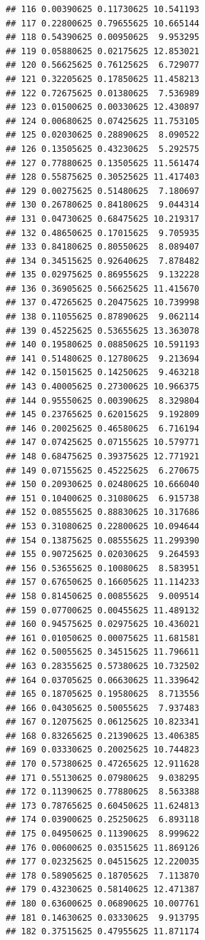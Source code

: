 \documentclass[
  12pt,
  a4paper,
  oneside]{book}
\theoremstyle{definition}
\theoremstyle{definition}
\theoremstyle{definition}
\theoremstyle{remark}
\begin{document}
\begin{lstlisting}
## 116 0.00390625 0.11730625 10.541193
## 117 0.22800625 0.79655625 10.665144
## 118 0.54390625 0.00950625  9.953295
## 119 0.05880625 0.02175625 12.853021
## 120 0.56625625 0.76125625  6.729077
## 121 0.32205625 0.17850625 11.458213
## 122 0.72675625 0.01380625  7.536989
## 123 0.01500625 0.00330625 12.430897
## 124 0.00680625 0.07425625 11.753105
## 125 0.02030625 0.28890625  8.090522
## 126 0.13505625 0.43230625  5.292575
## 127 0.77880625 0.13505625 11.561474
## 128 0.55875625 0.30525625 11.417403
## 129 0.00275625 0.51480625  7.180697
## 130 0.26780625 0.84180625  9.044314
## 131 0.04730625 0.68475625 10.219317
## 132 0.48650625 0.17015625  9.705935
## 133 0.84180625 0.80550625  8.089407
## 134 0.34515625 0.92640625  7.878482
## 135 0.02975625 0.86955625  9.132228
## 136 0.36905625 0.56625625 11.415670
## 137 0.47265625 0.20475625 10.739998
## 138 0.11055625 0.87890625  9.062114
## 139 0.45225625 0.53655625 13.363078
## 140 0.19580625 0.08850625 10.591193
## 141 0.51480625 0.12780625  9.213694
## 142 0.15015625 0.14250625  9.463218
## 143 0.40005625 0.27300625 10.966375
## 144 0.95550625 0.00390625  8.329804
## 145 0.23765625 0.62015625  9.192809
## 146 0.20025625 0.46580625  6.716194
## 147 0.07425625 0.07155625 10.579771
## 148 0.68475625 0.39375625 12.771921
## 149 0.07155625 0.45225625  6.270675
## 150 0.20930625 0.02480625 10.666040
## 151 0.10400625 0.31080625  6.915738
## 152 0.08555625 0.88830625 10.317686
## 153 0.31080625 0.22800625 10.094644
## 154 0.13875625 0.08555625 11.299390
## 155 0.90725625 0.02030625  9.264593
## 156 0.53655625 0.10080625  8.583951
## 157 0.67650625 0.16605625 11.114233
## 158 0.81450625 0.00855625  9.009514
## 159 0.07700625 0.00455625 11.489132
## 160 0.94575625 0.02975625 10.436021
## 161 0.01050625 0.00075625 11.681581
## 162 0.50055625 0.34515625 11.796611
## 163 0.28355625 0.57380625 10.732502
## 164 0.03705625 0.06630625 11.339642
## 165 0.18705625 0.19580625  8.713556
## 166 0.04305625 0.50055625  7.937483
## 167 0.12075625 0.06125625 10.823341
## 168 0.83265625 0.21390625 13.406385
## 169 0.03330625 0.20025625 10.744823
## 170 0.57380625 0.47265625 12.911628
## 171 0.55130625 0.07980625  9.038295
## 172 0.11390625 0.77880625  8.563388
## 173 0.78765625 0.60450625 11.624813
## 174 0.03900625 0.25250625  6.893118
## 175 0.04950625 0.11390625  8.999622
## 176 0.00600625 0.03515625 11.869126
## 177 0.02325625 0.04515625 12.220035
## 178 0.58905625 0.18705625  7.113870
## 179 0.43230625 0.58140625 12.471387
## 180 0.63600625 0.06890625 10.007761
## 181 0.14630625 0.03330625  9.913795
## 182 0.37515625 0.47955625 11.871174

\end{lstlisting}
\end{document}
